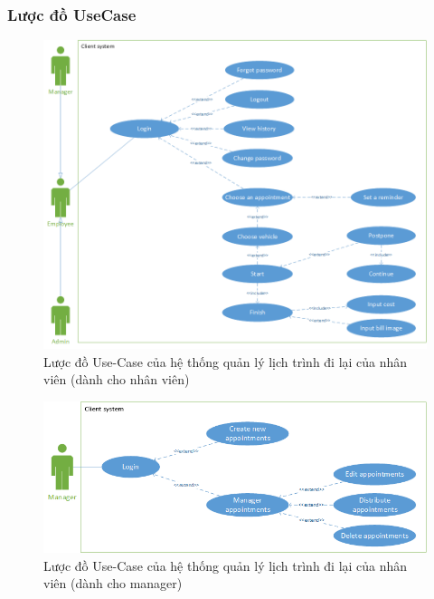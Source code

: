 \documentclass[a4paper]{article}
\begin{document}
\subsubsection{Lược đồ UseCase}
\begin{figure}[h]
    \includegraphics[scale=0.6]{UsecaseDiagram/UseCaseDiagramEmployeeTTTN}
    \centering
    \caption{Lược đồ Use-Case của hệ thống quản lý lịch trình đi lại của nhân viên (dành cho nhân viên)}
    \label{fig:usecase_employee}
\end{figure}
\newpage
\begin{figure}[!h]
    \includegraphics[scale=0.71]{UsecaseDiagram/UsecaseDiagramManagerTTTN}
    \centering
    \caption{Lược đồ Use-Case của hệ thống quản lý lịch trình đi lại của nhân viên (dành cho manager)}
    \label{fig:usecase_manager}
\end{figure}
\end{document}
